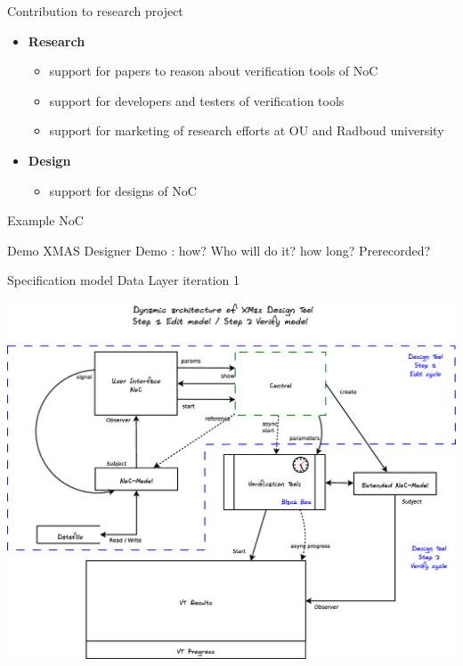 \documentclass[11pt]{beamer}
\begin{document}
\begin{frame}{Contribution to research project}

	\begin{itemize}
		\item {\bf Research}
		\begin{itemize}
			\item support for papers to reason about verification tools of NoC
			\item support for developers and testers of verification tools
			\item support for marketing of research efforts at OU and Radboud university
		\end{itemize}
		\item {\bf Design}
		\begin{itemize}
			\item support for designs of NoC
		\end{itemize}
	\end{itemize}

\end{frame}

\begin{frame}{Example NoC}

\end{frame}

\begin{frame}{Demo XMAS Designer}
	Demo : how? Who will do it? how long? Prerecorded?
\end{frame}

\begin{frame}{Specification model Data Layer iteration 1}

	\includegraphics[width=.95\linewidth]{pictures/1c-architecture-dynamic-1}

\end{frame}
\end{document}

